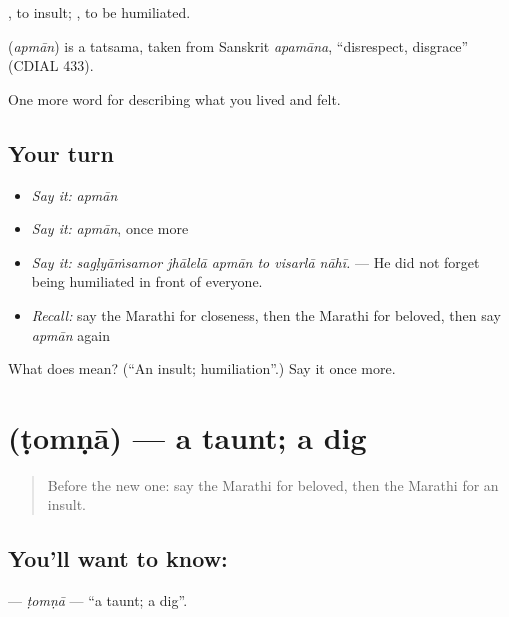  , to insult;  , to be humiliated.

\begin{cousinweb}
\textbf{} (\emph{apmān}) is a tatsama, taken from Sanskrit \emph{apamāna}, \textquotedblleft{}disrespect, disgrace\textquotedblright{} (CDIAL 433).
\end{cousinweb}

\begin{grammarlens}[title={What you've built}]
One more word for describing what you lived and felt.
\end{grammarlens}

\subsection*{Your turn}
\begin{itemize}
\raggedright
  \item \emph{Say it:} \emph{apmān}
  \item \emph{Say it:} \emph{apmān}, once more
  \item \emph{Say it:} \emph{sagḷyāṁsamor jhālelā apmān to visarlā nāhī.} — He did not forget being humiliated in front of everyone.
  \item \emph{Recall:} say the Marathi for closeness, then the Marathi for beloved, then say \emph{apmān} again
\end{itemize}

\begin{tcolorbox}[breakable,colback=teal!4,colframe=teal!35!black,title={Before you move on}]
What does  mean? (\textquotedblleft{}An insult; humiliation\textquotedblright{}.) Say it once more.
\end{tcolorbox}
\section[\texorpdfstring{\mr{टोमणा} (ṭomṇā)}{टोमणा (ṭomṇā)}]{ (ṭomṇā) — a taunt; a dig}

\label{lesson:MR-C461-tomna}



\begin{quote}
Before the new one: say the Marathi for beloved, then the Marathi for an insult.
\end{quote}

\subsection*{You'll want to know: }
\textbf{} — \emph{ṭomṇā} — \textquotedblleft{}a taunt; a dig\textquotedblright{}.

